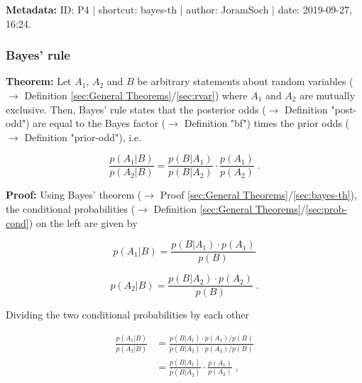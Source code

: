 \documentclass[a4paper,12pt,twoside]{book}
\begin{document}
\vspace{1em}
\textbf{Metadata:} ID: P4 | shortcut: bayes-th | author: JoramSoch | date: 2019-09-27, 16:24.
\vspace{1em}



\subsubsection[\textbf{Bayes' rule}]{Bayes' rule} \label{sec:bayes-rule}
\setcounter{equation}{0}

\textbf{Theorem:} Let $A_1$, $A_2$ and $B$ be arbitrary statements about random variables ($\rightarrow$ Definition \ref{sec:General Theorems}/\ref{sec:rvar}) where $A_1$ and $A_2$ are mutually exclusive. Then, Bayes' rule states that the posterior odds ($\rightarrow$ Definition "post-odd") are equal to the Bayes factor ($\rightarrow$ Definition "bf") times the prior odds ($\rightarrow$ Definition "prior-odd"), i.e.

\begin{equation} \label{eq:bayes-rule-bayes-rule}
\frac{p(A_1|B)}{p(A_2|B)} = \frac{p(B|A_1)}{p(B|A_2)} \cdot \frac{p(A_1)}{p(A_2)} \; .
\end{equation}


\vspace{1em}
\textbf{Proof:} Using Bayes' theorem ($\rightarrow$ Proof \ref{sec:General Theorems}/\ref{sec:bayes-th}), the conditional probabilities ($\rightarrow$ Definition \ref{sec:General Theorems}/\ref{sec:prob-cond}) on the left are given by

\begin{equation} \label{eq:bayes-rule-bayes-th-A1}
p(A_1|B) = \frac{p(B|A_1) \cdot p(A_1)}{p(B)}
\end{equation}

\begin{equation} \label{eq:bayes-rule-bayes-th-A2}
p(A_2|B) = \frac{p(B|A_2) \cdot p(A_2)}{p(B)} \; .
\end{equation}

Dividing the two conditional probabilities by each other

\begin{equation} \label{eq:bayes-rule-bayes-rule-qed}
\begin{split}
\frac{p(A_1|B)}{p(A_2|B)} &= \frac{p(B|A_1) \cdot p(A_1) / p(B)}{p(B|A_2) \cdot p(A_2) / p(B)} \\
&= \frac{p(B|A_1)}{p(B|A_2)} \cdot \frac{p(A_1)}{p(A_2)} \; ,
\end{split}
\end{equation}
\end{document}
